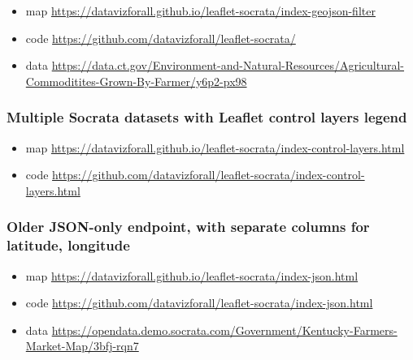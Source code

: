 \documentclass[
  english,
]{book}
\providecommand{\tightlist}{%
  \setlength{\itemsep}{0pt}\setlength{\parskip}{0pt}}
\begin{document}
\begin{itemize}
\tightlist
\item
  map \url{https://datavizforall.github.io/leaflet-socrata/index-geojson-filter}
\item
  code \url{https://github.com/datavizforall/leaflet-socrata/}
\item
  data \url{https://data.ct.gov/Environment-and-Natural-Resources/Agricultural-Commoditites-Grown-By-Farmer/y6p2-px98}
\end{itemize}

\hypertarget{multiple-socrata-datasets-with-leaflet-control-layers-legend}{%
\subsubsection*{Multiple Socrata datasets with Leaflet control layers legend}\label{multiple-socrata-datasets-with-leaflet-control-layers-legend}}

\begin{itemize}
\tightlist
\item
  map \url{https://datavizforall.github.io/leaflet-socrata/index-control-layers.html}
\item
  code \url{https://github.com/datavizforall/leaflet-socrata/index-control-layers.html}
\end{itemize}

\hypertarget{older-json-only-endpoint-with-separate-columns-for-latitude-longitude}{%
\subsubsection*{Older JSON-only endpoint, with separate columns for latitude, longitude}\label{older-json-only-endpoint-with-separate-columns-for-latitude-longitude}}

\begin{itemize}
\tightlist
\item
  map \url{https://datavizforall.github.io/leaflet-socrata/index-json.html}
\item
  code \url{https://github.com/datavizforall/leaflet-socrata/index-json.html}
\item
  data \url{https://opendata.demo.socrata.com/Government/Kentucky-Farmers-Market-Map/3bfj-rqn7}
\end{itemize}
\end{document}
